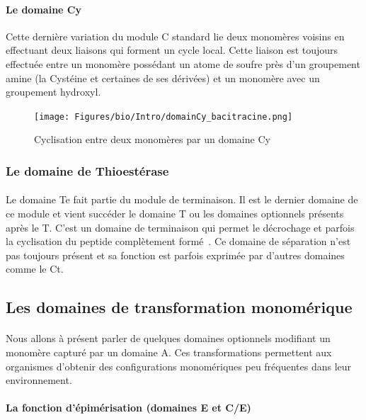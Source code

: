 \documentclass[12pt,french,twoside]{report}
\begin{document}
\paragraph{Le domaine Cy}
Cette dernière variation du module C standard lie deux monomères voisins en effectuant deux liaisons qui forment un cycle local.
Cette liaison est toujours effectuée entre un monomère possédant un atome de soufre près d'un groupement amine (la Cystéine et certaines de ses dérivées) et un monomère avec un groupement hydroxyl.

\begin{figure}[h!]
  \begin{center}
    \texttt{[image: Figures/bio/Intro/domainCy\_bacitracine.png]}
    \caption{\label{domaine_Cy}Cyclisation entre deux monomères par un domaine Cy}
  \end{center}
\end{figure}


\subsubsection{Le domaine de Thioestérase}

\paragraph{}Le domaine Te fait partie du module de terminaison.
Il est le dernier domaine de ce module et vient succéder le domaine T ou les domaines optionnels présents après le T.
C'est un domaine de terminaison qui permet le décrochage et parfois la cyclisation du peptide complètement formé~\cite{trauger_peptide_2000,kohli_thioesterase_2002}.
Ce domaine de séparation n'est pas toujours présent et sa fonction est parfois exprimée par d'autres domaines comme le Ct.


\subsection{Les domaines de transformation monomérique}

\paragraph{}Nous allons à présent parler de quelques domaines optionnels modifiant un monomère capturé par un domaine A.
Ces transformations permettent aux organismes d'obtenir des configurations monomériques peu fréquentes dans leur environnement.


\paragraph{La fonction d'épimérisation (domaines E et C/E)}
\end{document}
